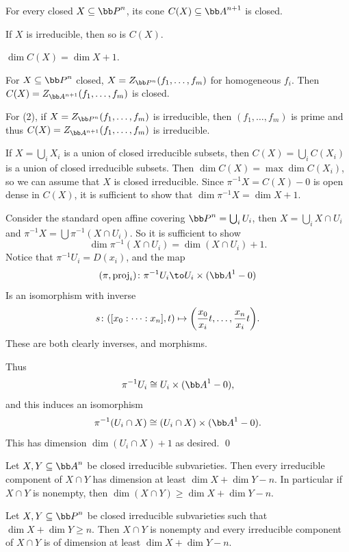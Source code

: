 \blemm

    \benum
        \item For every closed $X\subseteq\bP^n$, its cone $C(X)\subseteq\bA^{n+1}$ is closed.
        \item If $X$ is irreducible, then so is $C(X)$.
        \item $\dim C(X)=\dim X+1$.
    \eenum

\elemm

\bproof

    For $X\subseteq\bP^n$ closed, $X=Z_{\bP^n}(f_1,\dots,f_m)$ for homogeneous $f_i$.
    Then $C(X)=Z_{\bA^{n+1}}(f_1,\dots,f_m)$ is closed.

    For (2), if $X=Z_{\bP^n}(f_1,\dots,f_m)$ is irreducible, then $(f_1,\dots,f_m)$ is prime and thus $C(X)=Z_{\bA^{n+1}}(f_1,\dots,f_m)$
    is irreducible.

    If $X=\bigcup_iX_i$ is a union of closed irreducible subsets, then $C(X)=\bigcup_iC(X_i)$ is a union of closed irreducible subsets.
    Then $\dim C(X)=\max\dim C(X_i)$, so we can assume that $X$ is closed irreducible.
    Since $\pi^{-1}X=C(X)-0$ is open dense in $C(X)$, it is sufficient to show that $\dim\pi^{-1}X=\dim X+1$.

    Consider the standard open affine covering $\bP^n=\bigcup_iU_i$, then $X=\bigcup_iX\cap U_i$ and $\pi^{-1}X=\bigcup\pi^{-1}(X\cap U_i)$.
    So it is sufficient to show
    $$ \dim\pi^{-1}(X\cap U_i) = \dim(X\cap U_i) + 1 . $$
    Notice that $\pi^{-1}U_i=D(x_i)$, and the map
    $$ (\pi,\proj_i)\colon\pi^{-1}U_i \to U_i\times(\bA^1-0) $$
    Is an isomorphism with inverse
    $$ s\colon([x_0:\cdots:x_n],t) \mapsto \mathopen{}\mathclose{\left({{x_0}\over{x_i}}t,\dots,{{x_n}\over{x_i}}t\right)} . $$
    These are both clearly inverses, and morphisms.

    Thus
    $$ \pi^{-1}U_i \cong U_i\times(\bA^1-0) , $$
    and this induces an isomorphism
    $$ \pi^{-1}(U_i\cap X) \cong (U_i\cap X)\times(\bA^1-0) . $$
    This has dimension $\dim(U_i\cap X)+1$ as desired.
    \qed

\eproof

\bthrm

    \benum
        \item Let $X,Y\subseteq\bA^n$ be closed irreducible subvarieties.
        Then every irreducible component of $X\cap Y$ has dimension at least $\dim X+\dim Y-n$.
        In particular if $X\cap Y$ is nonempty, then $\dim(X\cap Y)\geq\dim X+\dim Y-n$.

        \item Let $X,Y\subseteq\bP^n$ be closed irreducible subvarieties such that $\dim X+\dim Y\geq n$.
        Then $X\cap Y$ is nonempty and every irreducible component of $X\cap Y$ is of dimension at least $\dim X+\dim Y-n$.
    \eenum

